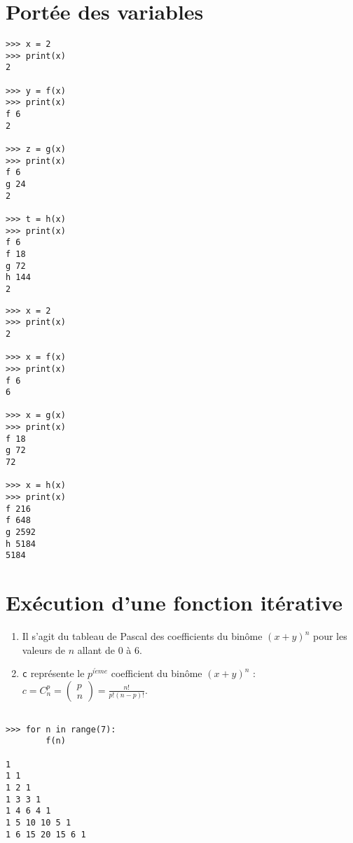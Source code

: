 \documentclass[11pt,a4paper]{article}
\begin{document}
\section{Portée des variables}
%

\begin{minipage}[t]{7cm}\footnotesize
\begin{verbatim}
>>> x = 2
>>> print(x)
2

>>> y = f(x)
>>> print(x)
f 6
2

>>> z = g(x)
>>> print(x)
f 6
g 24
2

>>> t = h(x)
>>> print(x)
f 6
f 18
g 72
h 144
2
\end{verbatim}
\end{minipage}
\hfill
\begin{minipage}[t]{7cm}\footnotesize
\begin{verbatim}
>>> x = 2
>>> print(x)
2

>>> x = f(x)
>>> print(x)
f 6
6

>>> x = g(x)
>>> print(x)
f 18
g 72
72

>>> x = h(x)
>>> print(x)
f 216
f 648
g 2592
h 5184
5184
\end{verbatim}
\end{minipage}


\section{Exécution d'une fonction itérative}
%

\noindent\begin{minipage}[t]{10cm}
\begin{enumerate}
\item Il s'agit du tableau de Pascal des coefficients du binôme $(x+y)^n$
	pour les valeurs de $n$ allant de 0 à 6.
\item {\tt c} représente le $p^{i\grave eme}$ coefficient du binôme $(x+y)^n$ :
	$\displaystyle c = C_n^p = \left(\begin{array}{c}p\\n\end{array}\right) =
	\frac{n!}{p!(n-p)!}$.
\end{enumerate}
\end{minipage}
\hfill
\begin{minipage}[t]{5cm}
\begin{verbatim}

>>> for n in range(7): 
        f(n)

1 
1 1 
1 2 1 
1 3 3 1 
1 4 6 4 1 
1 5 10 10 5 1 
1 6 15 20 15 6 1 
\end{verbatim}
\end{minipage}

\label{fini}
\end{document}
